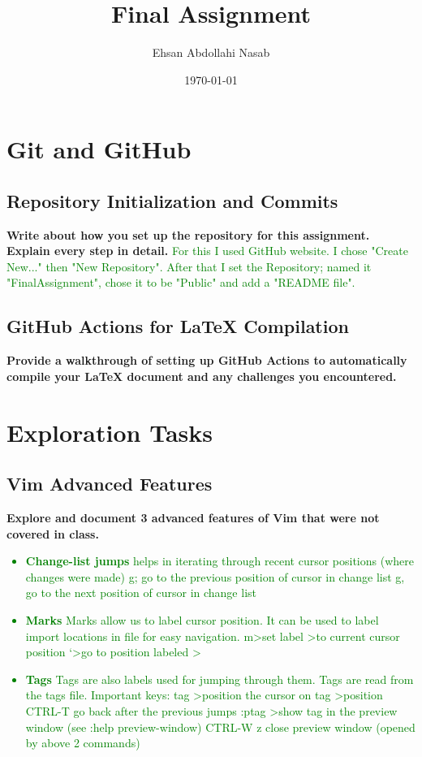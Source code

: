 \documentclass{article}
\title{Final Assignment}
\author{Ehsan Abdollahi Nasab}
\date{\today}
\begin{document}
\maketitle

\section{Git and GitHub}
\subsection{Repository Initialization and Commits}
\textbf{Write about how you set up the repository for this assignment. Explain every step in detail.}
\textcolor{green}{
    For this I used GitHub website. I chose "Create New..." then "New Repository". After that I set the Repository; named it "FinalAssignment", chose it to be "Public" and add a "README file".}
\subsection{GitHub Actions for LaTeX Compilation}
\textbf{Provide a walkthrough of setting up GitHub Actions to automatically compile your LaTeX document and any challenges you encountered.}
\textcolor{green}{}

\section{Exploration Tasks}
\subsection{Vim Advanced Features}
\textbf{Explore and document 3 advanced features of Vim that were not covered in class.}
\textcolor{green}{\begin{itemize}
    \item \textbf{Change-list jumps} helps in iterating through recent cursor positions (where changes were made)
    g; go to the previous position of cursor in change list
    g, go to the next position of cursor in change list
    \item \textbf{Marks} Marks allow us to label cursor position. It can be used to label import
    locations in file for easy navigation.
    m\textlesschar\textgreater set label \textlesschar\textgreater to current cursor position
    ‘\textlesschar\textgreater go to position labeled \textlesschar\textgreater
    \item \textbf{Tags} Tags are also labels used for jumping through them. Tags are read from the
    tags file.
    Important keys:
    tag \textlesstagname\textgreater position the cursor on tag \textlesstagname\textgreater position
    CTRL-T go back after the previous jumps
    :ptag \textlesstagname\textgreater show tag in the preview window (see :help preview-window)
    CTRL-W z close preview window (opened by above 2 commands)\end{itemize}
}
\end{document}

